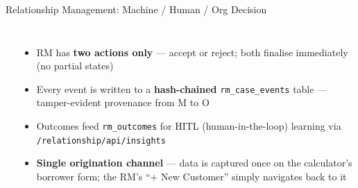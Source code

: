 \documentclass[9pt,aspectratio=169]{beamer}
\begin{document}
\begin{frame}{Relationship Management: Machine / Human / Org Decision}
\vspace{-2pt}
\begin{columns}[T]
    \begin{center}
    \end{center}
    \footnotesize
    \begin{itemize}\setlength\itemsep{4pt}
      \item[\small$\bullet$] RM has \textbf{two actions only} --- accept or reject; both finalise
            immediately (no partial states)
      \item[\small$\bullet$] Every event is written to a \textbf{hash-chained} \texttt{rm\_case\_events}
            table --- tamper-evident provenance from M to O
      \item[\small$\bullet$] Outcomes feed \texttt{rm\_outcomes} for HITL (human-in-the-loop)
            learning via \texttt{/relationship/api/insights}
      \item[\small$\bullet$] \textbf{Single origination channel} --- data is captured once on the
            calculator's borrower form; the RM's ``+ New Customer'' simply navigates back to it
    \end{itemize}
\end{columns}
\end{frame}
\end{document}

